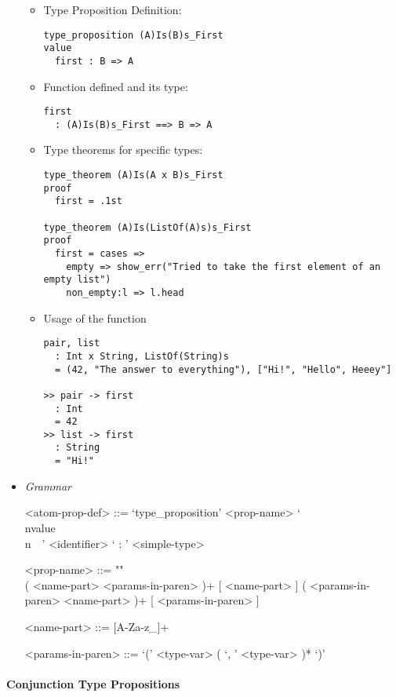 \documentclass{article}
\begin{document}
\begin{itemize}
\begin{itemize}
\item Type Proposition Definition:

\begin{verbatim}
type_proposition (A)Is(B)s_First
value
  first : B => A
\end{verbatim}

\item Function defined and its type:

\begin{verbatim}
first
  : (A)Is(B)s_First ==> B => A
\end{verbatim}

\item Type theorems for specific types:

\begin{verbatim}
type_theorem (A)Is(A x B)s_First
proof
  first = .1st

type_theorem (A)Is(ListOf(A)s)s_First
proof
  first = cases =>
    empty => show_err("Tried to take the first element of an empty list")
    non_empty:l => l.head
\end{verbatim}

\item Usage of the function
\begin{verbatim}
pair, list
  : Int x String, ListOf(String)s
  = (42, "The answer to everything"), ["Hi!", "Hello", Heeey"]

>> pair -> first
  : Int
  = 42
>> list -> first
  : String
  = "Hi!"
\end{verbatim}
\end{itemize}


\item \textit{Grammar}
\begin{grammar}
<atom-prop-def> ::=
`type_proposition' <prop-name>
`\\nvalue\\n\ \ ' <identifier> ` : ' <simple-type>

<prop-name> ::=  ""\\
( <name-part> <params-in-paren> )+ [ <name-part> ]
\alt ( <params-in-paren> <name-part> )+ [ <params-in-paren> ]

<name-part> ::= [A-Za-z_]+

<params-in-paren> ::= `(' <type-var> ( `, ' <type-var> )* `)'
\end{grammar} 
\end{itemize}

\paragraph{Conjunction Type Propositions}
\end{document}
